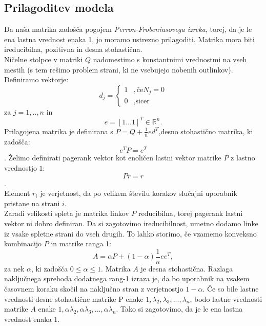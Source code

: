 \documentclass[a4paper]{article}
\begin{document}
\subsection{Prilagoditev modela} Da naša matrika zadošča pogojem \textit{Perron-Frobeniusovega izreka}, torej, da je le ena lastna vrednost enaka 1, jo moramo ustrezno prilagoditi. Matrika mora biti ireducibilna, pozitivna in desna stohastična.\\
 Ničelne stolpce v matriki $Q$ nadomestimo s konstantnimi vrednostmi na vseh mestih (s tem rešimo problem strani, ki ne vsebujejo nobenih outlinkov). 
\\Definiramo vektorje: \\
\[
d_j = 
\left \{
	\begin{array}{ll}
		1  &, \mbox{če} N_j = 0 \\
		0 &, \mbox{sicer} 
	\end{array}
\right. \]
za $j = 1, .., n$ in
$$e = [1 … 1] ^T \in \mathbb{R}^n.$$
Prilagojena matrika je definirana s $ P = Q + \frac{1}{n}ed^T$,desno stohastično matrika, ki zadošča:
$$e^TP = e^T$$.
Želimo definirati pagerank vektor kot enoličen lastni vektor matrike $P$ z lastno vrednostjo $1$:
$$Pr=r$$. \\
Element $r_i$ je verjetnost, da po velikem številu korakov slučajni uporabnik pristane na strani $i$.\\
Zaradi velikosti spleta je matrika linkov $P$ reducibilna, torej pagerank lastni vektor ni dobro definiran. Da si zagotovimo ireducibilnost, umetno dodamo linke iz vsake spletne strani do vseh drugih. To lahko storimo, če vzamemo konveksno kombinacijo $P$ in matrike ranga 1:
$$A=\alpha P + (1-\alpha)\frac{1}{n}ee^T,$$
za nek $\alpha$, ki zadošča $0 \leq \alpha \leq 1$. Matrika $A$ je desna stohastična. Razlaga naključnega sprehoda dodatnega rang-1 izraza je, da bo uporabnik na vsakem časovnem koraku skočil na naključno stran z verjetnostjo $1- \alpha$. Če so bile lastne vrednosti desne stohastične matrike P enake $1, \lambda_2, \lambda_3, ... , \lambda_n$, bodo lastne vrednosti matrike $A$ enake $1, \alpha \lambda_2, \alpha \lambda_3, ... , \alpha \lambda_n$. Tako si zagotovimo, da je le ena lastna vrednost enaka 1.
\end{document}
